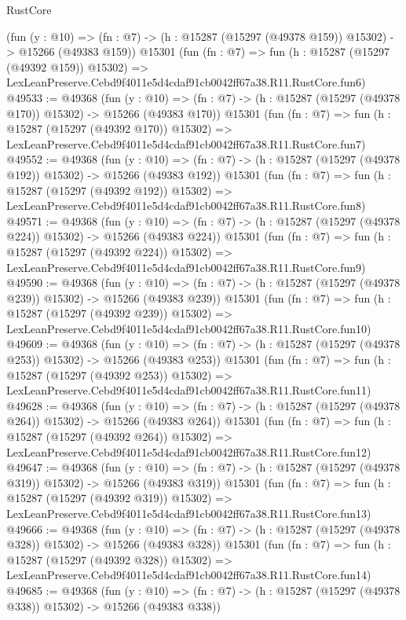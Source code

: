 \begin{lexlean}{RustCore}
\begin{coremodule}
    (fun (y : @10) =>
    (fn : @7) -> (h : @15287 (@15297 (@49378 @159)) @15302) -> @15266 (@49383 @159))
    @15301
    (fun (fn : @7) =>
    fun (h : @15287 (@15297 (@49392 @159)) @15302) =>
    LexLeanPreserve.Cebd9f4011e5d4cdaf91cb0042ff67a38.R11.RustCore.fun6)
@49533 := @49368
    (fun (y : @10) =>
    (fn : @7) -> (h : @15287 (@15297 (@49378 @170)) @15302) -> @15266 (@49383 @170))
    @15301
    (fun (fn : @7) =>
    fun (h : @15287 (@15297 (@49392 @170)) @15302) =>
    LexLeanPreserve.Cebd9f4011e5d4cdaf91cb0042ff67a38.R11.RustCore.fun7)
@49552 := @49368
    (fun (y : @10) =>
    (fn : @7) -> (h : @15287 (@15297 (@49378 @192)) @15302) -> @15266 (@49383 @192))
    @15301
    (fun (fn : @7) =>
    fun (h : @15287 (@15297 (@49392 @192)) @15302) =>
    LexLeanPreserve.Cebd9f4011e5d4cdaf91cb0042ff67a38.R11.RustCore.fun8)
@49571 := @49368
    (fun (y : @10) =>
    (fn : @7) -> (h : @15287 (@15297 (@49378 @224)) @15302) -> @15266 (@49383 @224))
    @15301
    (fun (fn : @7) =>
    fun (h : @15287 (@15297 (@49392 @224)) @15302) =>
    LexLeanPreserve.Cebd9f4011e5d4cdaf91cb0042ff67a38.R11.RustCore.fun9)
@49590 := @49368
    (fun (y : @10) =>
    (fn : @7) -> (h : @15287 (@15297 (@49378 @239)) @15302) -> @15266 (@49383 @239))
    @15301
    (fun (fn : @7) =>
    fun (h : @15287 (@15297 (@49392 @239)) @15302) =>
    LexLeanPreserve.Cebd9f4011e5d4cdaf91cb0042ff67a38.R11.RustCore.fun10)
@49609 := @49368
    (fun (y : @10) =>
    (fn : @7) -> (h : @15287 (@15297 (@49378 @253)) @15302) -> @15266 (@49383 @253))
    @15301
    (fun (fn : @7) =>
    fun (h : @15287 (@15297 (@49392 @253)) @15302) =>
    LexLeanPreserve.Cebd9f4011e5d4cdaf91cb0042ff67a38.R11.RustCore.fun11)
@49628 := @49368
    (fun (y : @10) =>
    (fn : @7) -> (h : @15287 (@15297 (@49378 @264)) @15302) -> @15266 (@49383 @264))
    @15301
    (fun (fn : @7) =>
    fun (h : @15287 (@15297 (@49392 @264)) @15302) =>
    LexLeanPreserve.Cebd9f4011e5d4cdaf91cb0042ff67a38.R11.RustCore.fun12)
@49647 := @49368
    (fun (y : @10) =>
    (fn : @7) -> (h : @15287 (@15297 (@49378 @319)) @15302) -> @15266 (@49383 @319))
    @15301
    (fun (fn : @7) =>
    fun (h : @15287 (@15297 (@49392 @319)) @15302) =>
    LexLeanPreserve.Cebd9f4011e5d4cdaf91cb0042ff67a38.R11.RustCore.fun13)
@49666 := @49368
    (fun (y : @10) =>
    (fn : @7) -> (h : @15287 (@15297 (@49378 @328)) @15302) -> @15266 (@49383 @328))
    @15301
    (fun (fn : @7) =>
    fun (h : @15287 (@15297 (@49392 @328)) @15302) =>
    LexLeanPreserve.Cebd9f4011e5d4cdaf91cb0042ff67a38.R11.RustCore.fun14)
@49685 := @49368
    (fun (y : @10) =>
    (fn : @7) -> (h : @15287 (@15297 (@49378 @338)) @15302) -> @15266 (@49383 @338))

\end{coremodule}
\end{lexlean}
